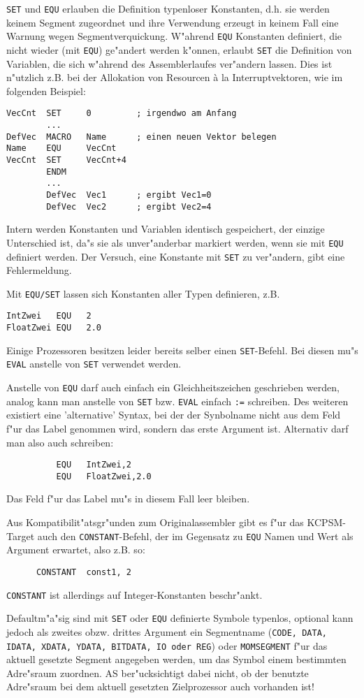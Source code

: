 \documentclass[12pt,a4paper,twoside]{report}
\newcommand{\tty}[1]{{\tt #1}}
\begin{document}
\tty{SET} und \tty{EQU} erlauben die Definition typenloser Konstanten, d.h. sie
werden keinem Segment zugeordnet und ihre Verwendung erzeugt in keinem
Fall eine Warnung wegen Segmentverquickung.  W"ahrend \tty{EQU} Konstanten
definiert, die nicht wieder (mit \tty{EQU}) ge"andert werden k"onnen, erlaubt
\tty{SET} die Definition von Variablen, die sich w"ahrend des Assemblerlaufes
ver"andern lassen.  Dies ist n"utzlich z.B. bei der Allokation von
Resourcen \`a la Interruptvektoren, wie im folgenden Beispiel:
\begin{verbatim}
VecCnt  SET     0         ; irgendwo am Anfang
        ...
DefVec  MACRO   Name      ; einen neuen Vektor belegen
Name    EQU     VecCnt
VecCnt  SET     VecCnt+4
        ENDM
        ...
        DefVec  Vec1      ; ergibt Vec1=0
        DefVec  Vec2      ; ergibt Vec2=4
\end{verbatim}
Intern werden Konstanten und Variablen identisch gespeichert, der
einzige Unterschied ist, da"s sie als unver"anderbar markiert werden, wenn
sie mit \tty{EQU} definiert werden.  Der Versuch, eine Konstante mit
\tty{SET} zu ver"andern, gibt eine Fehlermeldung.
\par
Mit \tty{EQU/SET} lassen sich Konstanten aller Typen definieren, z.B.
\begin{verbatim}
IntZwei   EQU   2
FloatZwei EQU   2.0
\end{verbatim}
Einige Prozessoren besitzen leider bereits selber einen \tty{SET}-Befehl.
Bei diesen mu"s \tty{EVAL} anstelle von \tty{SET} verwendet werden.
\par
Anstelle von \tty{EQU} darf auch einfach ein Gleichheitszeichen geschrieben
werden, analog kann man anstelle von \tty{SET} bzw. \tty{EVAL}
einfach \tty{:=} schreiben.  Des weiteren existiert eine
'alternative' Syntax, bei der der Synbolname nicht aus dem Feld
f"ur das Label genommen wird, sondern das erste Argument ist.
Alternativ darf man also auch schreiben:
\begin{verbatim}
          EQU   IntZwei,2
          EQU   FloatZwei,2.0
\end{verbatim}
Das Feld f"ur das Label mu"s in diesem Fall leer bleiben.
\par
Aus Kompatibilit"atsgr"unden zum Originalassembler gibt es f"ur das
KCPSM-Target auch den {\tt CONSTANT}-Befehl, der im Gegensatz zu {\tt EQU}
Namen und Wert als Argument erwartet, also z.B. so:
\begin{verbatim}
      CONSTANT  const1, 2
\end{verbatim}
{\tt CONSTANT} ist allerdings auf Integer-Konstanten beschr"ankt.
\par
Defaultm"a"sig sind mit \tty{SET} oder \tty{EQU} definierte Symbole
typenlos, optional kann jedoch als zweites obzw. drittes Argument ein
Segmentname (\tty{CODE, DATA, IDATA, XDATA, YDATA, BITDATA, IO oder REG})
oder \tty{MOMSEGMENT} f"ur das aktuell gesetzte Segment angegeben werden,
um das Symbol einem bestimmten Adre"sraum zuordnen.  AS ber"ucksichtigt
dabei nicht, ob der benutzte Adre"sraum bei dem aktuell gesetzten
Zielprozessor auch vorhanden ist!
\end{document}
